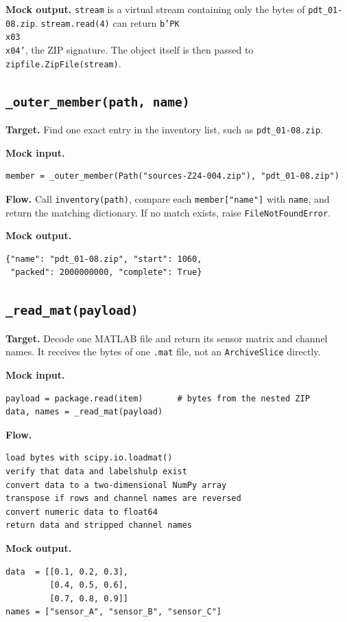 \documentclass[11pt,a4paper]{article}
\begin{document}
\textbf{Mock output.} \texttt{stream} is a virtual stream containing only the bytes of \texttt{pdt\_01-08.zip}. \texttt{stream.read(4)} can return \texttt{b'PK\\x03\\x04'}, the ZIP signature. The object itself is then passed to \texttt{zipfile.ZipFile(stream)}.

\subsection{\texttt{\_outer\_member(path, name)}}
\textbf{Target.} Find one exact entry in the inventory list, such as \texttt{pdt\_01-08.zip}.

\textbf{Mock input.}
\begin{lstlisting}
member = _outer_member(Path("sources-Z24-004.zip"), "pdt_01-08.zip")
\end{lstlisting}

\textbf{Flow.} Call \texttt{inventory(path)}, compare each \texttt{member["name"]} with \texttt{name}, and return the matching dictionary. If no match exists, raise \texttt{FileNotFoundError}.

\textbf{Mock output.}
\begin{lstlisting}
{"name": "pdt_01-08.zip", "start": 1060,
 "packed": 2000000000, "complete": True}
\end{lstlisting}

\subsection{\texttt{\_read\_mat(payload)}}
\textbf{Target.} Decode one MATLAB file and return its sensor matrix and channel names. It receives the bytes of one \texttt{.mat} file, not an \texttt{ArchiveSlice} directly.

\textbf{Mock input.}
\begin{lstlisting}
payload = package.read(item)       # bytes from the nested ZIP
data, names = _read_mat(payload)
\end{lstlisting}

\textbf{Flow.}
\begin{lstlisting}
load bytes with scipy.io.loadmat()
verify that data and labelshulp exist
convert data to a two-dimensional NumPy array
transpose if rows and channel names are reversed
convert numeric data to float64
return data and stripped channel names
\end{lstlisting}

\textbf{Mock output.}
\begin{lstlisting}
data  = [[0.1, 0.2, 0.3],
         [0.4, 0.5, 0.6],
         [0.7, 0.8, 0.9]]
names = ["sensor_A", "sensor_B", "sensor_C"]
\end{lstlisting}
\end{document}

